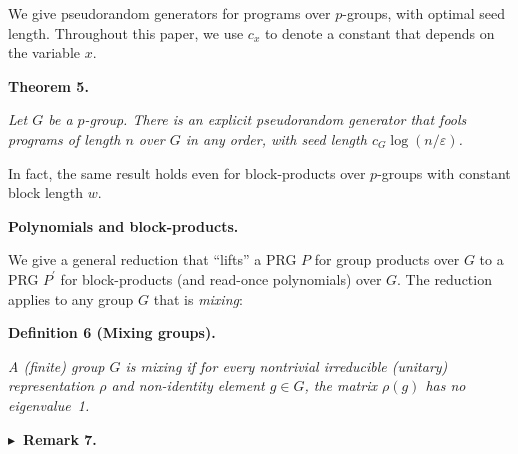 \documentclass[10pt,a4paper]{article}
\begin{document}
We give pseudorandom generators for programs over $p$-groups, with
optimal seed length. Throughout this paper, we use $c_{x}$ to denote a constant that depends on the variable $x$.\par






\par\medskip\noindent\textbf{
\textbf{Theorem 5}\textbf{.}
}\par



\emph{Let $G$ be a $p$-group. There is an
explicit pseudorandom generator that fools programs of length $n$
over $G$ in any order, with seed length $c_{G}\log(n/\varepsilon)$.}\par







In fact, the same result holds even for block-products over $p$-groups
with constant block length $w$.\par




\par\medskip\noindent\textbf{Polynomials and block-products.}\par




We give a general reduction that “lifts” a PRG $P$ for group
products over $G$ to a PRG $P^{\prime}$ for block-products (and read-once
polynomials) over $G$. The reduction applies to any group $G$ that is \emph{mixing}:\par





\par\medskip\noindent\textbf{
\textbf{Definition 6}\textbf{ }(Mixing groups)\textbf{.}
}\par



\emph{A (finite) group $G$ is mixing if for every nontrivial irreducible (unitary) representation $\rho$ and non-identity element $g\in G$, the matrix $\rho(g)$ has no eigenvalue 1.}\par







\par\medskip\noindent\textbf{
$\blacktriangleright$ Remark 7.
}\par
\end{document}
